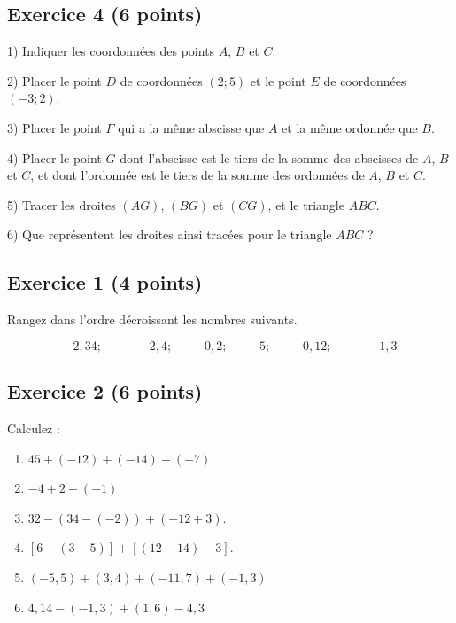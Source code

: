 \documentclass[14pt]{extreport}
\theoremstyle{plain}
\begin{document}
\subsection*{Exercice 4 (6 points)}

\begin{figure}[H]\center
{}
\end{figure}
1) Indiquer les coordonnées des points $A$, $B$ et $C$. 

2) Placer le point $D$ de coordonnées $(2; 5)$ et le point $E$ de coordonnées $(-3; 2)$. 

3) Placer le point $F$ qui a la même abscisse que $A$ et la même 
ordonnée que $B$. 



4) Placer le point $G$ dont l'abscisse est le tiers de la somme des 
abscisses de $A$, $B$ et $C$, et dont l'ordonnée est le tiers de la 
somme des ordonnées de $A$, $B$ et $C$. 

5) Tracer les droites $(AG)$, $(BG)$ et $(CG)$, et le triangle $ABC$. 

6) Que représentent les droites ainsi tracées pour le triangle $ABC$ ?
\newpage 



\subsection*{Exercice 1 (4 points)}
 
 Rangez dans l'ordre décroissant les nombres suivants. 
 

\[ -2,34 ;\phantom{meow} -2,4;\phantom{meow} 0,2 ;\phantom{meow} 5;\phantom{meow} 0,12 ;\phantom{meow} -1,3\]
 
 
 
\subsection*{Exercice 2 (6 points)}
 
 Calculez : \begin{enumerate}
 \item $45 + (-12) + (-14) + (+7) $
 \item $-4 + 2 - (-1)$
 \item $ 32 - (34 - (-2)) + (-12 + 3)$.
 \item $ [ 6 - (3 - 5)] + [(12-14) -3]$.
 \item $ (-5,5) + (3,4)  + (-11,7) + (-1,3)$
 \item $ 4,14 - (-1,3) + (1,6) - 4,3$
 \end{enumerate}
\end{document}
